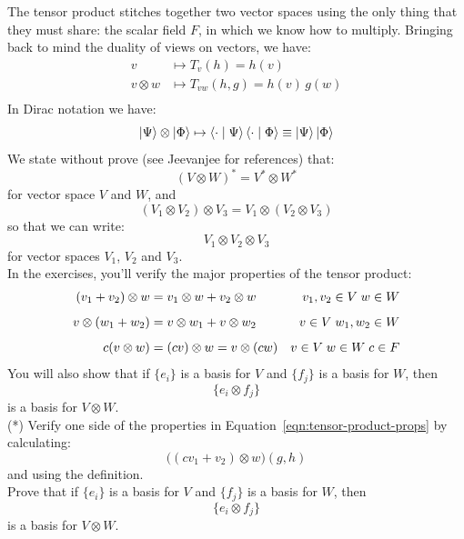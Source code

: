 \documentclass[12pt]{article}
\begin{document}
\noindent
The tensor product stitches together two vector spaces using the only
thing that they must share: the scalar field $F$, in which we know how to
multiply.  Bringing back to mind the duality of views on vectors, we
have:
\begin{align*}
  v &\mapsto T_v(h) = h(v) \\
  v\otimes w &\mapsto T_{vw}(h,g) = h(v)\,g(w) \\
\end{align*}
In Dirac notation we have:
$$\ket{\Psi} \otimes \ket{\Phi} \mapsto \braket{\cdot \mid \Psi} \braket{\cdot \mid \Phi} \equiv \ket{\Psi} \ket{\Phi}$$
We state without prove (see Jeevanjee for references) that:
$$(V \otimes W)^* = V^* \otimes W^*$$
for vector space $V$ and $W$, and  
$$(V_1 \otimes V_2) \otimes V_3 = V_1 \otimes (V_2 \otimes V_3)$$
so that we can write:
$$V_1 \otimes V_2 \otimes V_3$$
for vector spaces $V_1$, $V_2$ and $V_3$.\\[5pt]
\noindent
In the exercises, you'll verify the major properties of the tensor product:
\begin{align}
(v_1 + v_2) \otimes w &= v_1 \otimes w + v_2 \otimes w & v_1,v_2 \in V \; w \in W \notag \\[5pt]
v \otimes (w_1 + w_2) &= v \otimes w_1 + v \otimes w_2 & v \in V \; w_1,w_2 \in W\notag \\[5pt]
c(v \otimes w) &= (cv) \otimes w = v \otimes (cw)  & v \in V \; w \in W \; c \in F \label{eqn:tensor-product-props}
\end{align}
You will also show that if $\{e_i\}$ is a basis for $V$ and 
$\{f_j\}$ is a basis for $W$, then
$$\{e_i \otimes f_j\}$$
is a basis for $V \otimes W$.\\[5pt]

\exercise (*) Verify one side of the properties in
Equation~\ref{eqn:tensor-product-props} by calculating:
$$\big( (c v_1 + v_2) \otimes w \big)(g,h)$$ 
and using the definition.\\[5pt]

\exercise Prove that if $\{e_i\}$ is a basis for $V$ and $\{f_j\}$
is a basis for $W$, then $$\{e_i \otimes f_j\}$$ is a basis for $V
\otimes W$.\\[5pt]

\noindent
\end{document}
